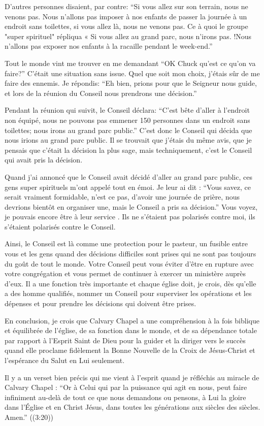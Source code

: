 D'autres personnes disaient, par contre: “Si vous allez sur son terrain, nous ne venons pas. Nous n’allons pas imposer
à nos enfants de passer la journée à un endroit sans toilettes, si vous allez là, nous ne venons pas. Ce à quoi le
groupe "super spirituel" répliqua « Si vous allez au grand parc, nous n’irons pas. !Nous n’allons pas exposer nos
enfants à la racaille pendant le week-end.”

Tout le monde vint me trouver en me demandant “OK Chuck qu’est ce qu’on va faire?” C’était une situation sans
issue. Quel que soit mon choix, j'étais sûr de me faire des ennemis. Je répondis: “Eh bien, prions pour que le
Seigneur nous guide, et lors de la réunion du Conseil nous prendrons une décision.”

Pendant la réunion qui suivit, le Conseil déclara: “C’est bête d’aller à l’endroit non équipé, nous ne pouvons pas
emmener 150 personnes dans un endroit sans toilettes; nous irons au grand parc public.” C’est donc le Conseil qui
décida que nous irions au grand parc public. Il se trouvait que j’étais du même avis, que je pensais que c’était la
décision la plus sage, mais techniquement, c’est le Conseil qui avait pris la décision.

Quand j'ai annoncé que le Conseil avait décidé d’aller au grand parc public, ces gens super spirituels m’ont appelé
tout en émoi. Je leur ai dit : “Vous savez, ce serait vraiment formidable, n’est ce pas, d’avoir une journée de prière,
nous devrions bientôt en organiser une, mais le Conseil a pris sa décision.” Vous voyez, je pouvais encore être à leur
service . Ils ne s'étaient pas polarisés contre moi, ils s'étaient polarisés contre le Conseil.

Ainsi, le Conseil est là comme une protection pour le pasteur, un fusible entre vous et les gens quand des décisions
difficiles sont prises qui ne sont pas toujours du goût de tout le monde. Votre Conseil peut vous éviter d’être en
rupture avec votre congrégation et vous permet de continuer à exercer un ministère auprès d’eux. Il a une fonction
très importante et chaque église doit, je crois, dès qu’elle a des homme qualifiés, nommer un Conseil pour superviser
les opérations et les dépenses et pour prendre les décisions qui doivent être prises.

En conclusion, je crois que Calvary Chapel a une compréhension à la fois biblique et équilibrée de l'église, de sa
fonction dans le monde, et de sa dépendance totale par rapport à l’Esprit Saint de Dieu pour la guider et la diriger
vers le succès quand elle proclame fidèlement la Bonne Nouvelle de la Croix de Jésus-Christ et l’espérance du Salut en
Lui seulement.

Il y a un verset bien précis qui me vient à l’esprit quand je réfléchis au miracle de Calvary Chapel : “Or à Celui qui par
la puissance qui agit en nous, peut faire infiniment au-delà de tout ce que nous demandons ou pensons, à Lui la
gloire dans l’Église et en Christ Jésus, dans toutes les générations aux siècles des siècles. Amen.” ((3:20))
